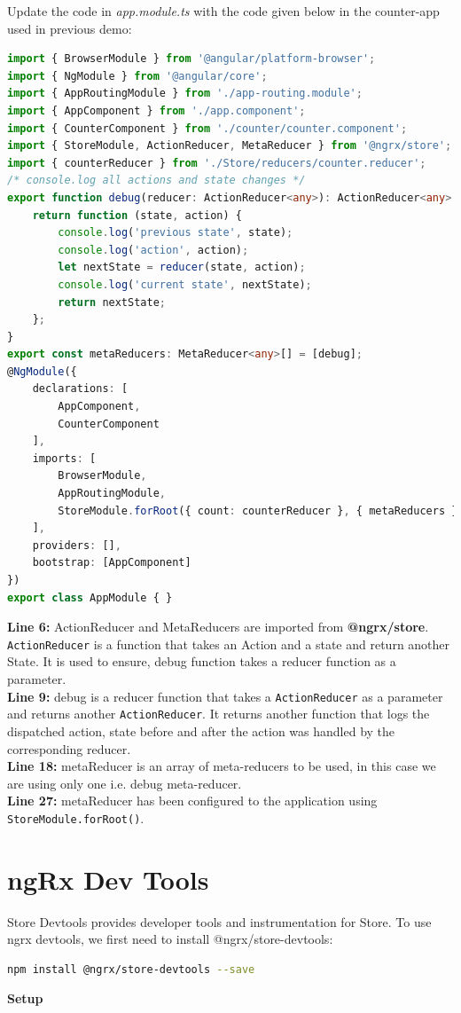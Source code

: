 \documentclass{report}
\begin{document}
Update the code in \textit{app.module.ts} with the code given below in the counter-app used in previous demo:
\begin{lstlisting}[language=Typescript, caption=app.module.ts]
import { BrowserModule } from '@angular/platform-browser';
import { NgModule } from '@angular/core';
import { AppRoutingModule } from './app-routing.module';
import { AppComponent } from './app.component';
import { CounterComponent } from './counter/counter.component';
import { StoreModule, ActionReducer, MetaReducer } from '@ngrx/store';
import { counterReducer } from './Store/reducers/counter.reducer';
/* console.log all actions and state changes */
export function debug(reducer: ActionReducer<any>): ActionReducer<any> {
	return function (state, action) {
		console.log('previous state', state);
		console.log('action', action);
		let nextState = reducer(state, action);
		console.log('current state', nextState);
		return nextState;
	};
}
export const metaReducers: MetaReducer<any>[] = [debug];
@NgModule({
	declarations: [
		AppComponent,
		CounterComponent
	],
	imports: [
		BrowserModule,
		AppRoutingModule,
		StoreModule.forRoot({ count: counterReducer }, { metaReducers })
	],
	providers: [],
	bootstrap: [AppComponent]
})
export class AppModule { }
\end{lstlisting}

\textbf{Line 6:} ActionReducer and MetaReducers are imported from \textbf{@ngrx/store}. \lstinline{ActionReducer} is a function that takes an Action and a state and return another State. It is used to ensure, debug function takes a reducer function as a parameter.\\
\textbf{Line 9:} debug is a reducer function that takes a \lstinline{ActionReducer} as a parameter and returns another \lstinline{ActionReducer}. It returns another function that logs the dispatched action, state before and after the action was handled by the corresponding reducer.\\
\textbf{Line 18:} metaReducer is an array of meta-reducers to be used, in this case we are using only one i.e. debug meta-reducer.\\
\textbf{Line 27:} metaReducer has been configured to the application using \lstinline{StoreModule.forRoot()}.

\section{ngRx Dev Tools}
Store Devtools provides developer tools and instrumentation for Store.
To use ngrx devtools, we first need to install @ngrx/store-devtools:
\begin{lstlisting}[language=bash]
npm install @ngrx/store-devtools --save
\end{lstlisting}
\textbf{Setup}
\end{document}
